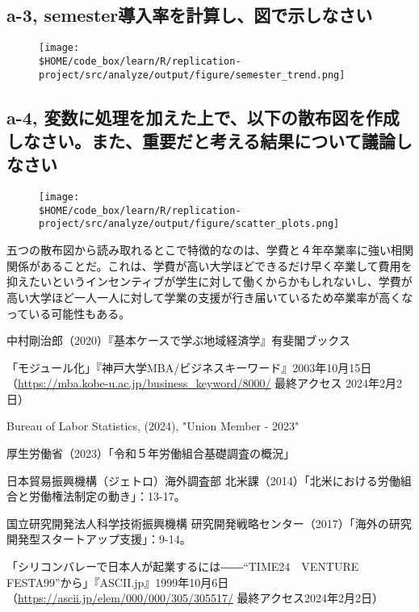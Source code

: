 \documentclass[a4paper]{jsarticle}
\begin{document}
\subsection*{a-3, semester導入率を計算し、図で示しなさい}

\begin{figure}[H]
  \centering
  \texttt{[image: \\\$HOME/code\_box/learn/R/replication-project/src/analyze/output/figure/semester\_trend.png]}

\end{figure}

\subsection*{a-4, 変数に処理を加えた上で、以下の散布図を作成しなさい。また、重要だと考える結果について議論しなさい}

\begin{figure}[H]
  \centering
  \texttt{[image: \\\$HOME/code\_box/learn/R/replication-project/src/analyze/output/figure/scatter\_plots.png]}

\end{figure}

五つの散布図から読み取れるとこで特徴的なのは、学費と４年卒業率に強い相関関係があることだ。これは、学費が高い大学ほどできるだけ早く卒業して費用を抑えたいというインセンティブが学生に対して働くからかもしれないし、学費が高い大学ほど一人一人に対して学業の支援が行き届いているため卒業率が高くなっている可能性もある。

\begin{thebibliography}{9}
  中村剛治郎（2020）『基本ケースで学ぶ地域経済学』有斐閣ブックス

  「モジュール化」『神戸大学MBA/ビジネスキーワード』2003年10月15日（\url{https://mba.kobe-u.ac.jp/business_keyword/8000/} 最終アクセス 2024年2月2日）

  Bureau of Labor Statistics, (2024), "Union Member - 2023"

  厚生労働省（2023）「令和５年労働組合基礎調査の概況」

  日本貿易振興機構（ジェトロ）海外調査部 北米課（2014）「北米における労働組合と労働権法制定の動き」：13-17。

  国立研究開発法人科学技術振興機構 研究開発戦略センター（2017）「海外の研究開発型スタートアップ支援」：9-14。

  「シリコンバレーで日本人が起業するには――“TIME24　VENTURE　FESTA99”から」『ASCII.jp』1999年10月6日（\url{https://ascii.jp/elem/000/000/305/305517/} 最終アクセス2024年2月2日）
\end{thebibliography}
\end{document}
